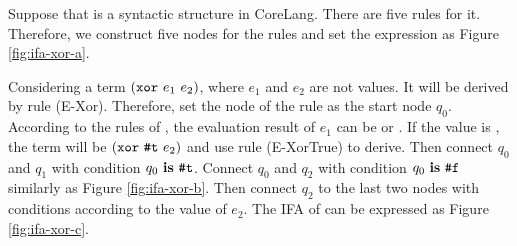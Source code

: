 
Suppose that  is a syntactic structure in CoreLang. There are five rules for it. Therefore, we construct five nodes for the rules and set the expression as Figure \ref{fig:ifa-xor-a}.

Considering a term $(\mbox{\tt xor}~e_1~e_2)$, where $e_1$ and $e_2$ are not values. It will be derived by rule (E-Xor). Therefore, set the node of the rule as the start node $q_0$. According to the rules of , the evaluation result of $e_1$ can be  or . If the value is , the term will be $(\mbox{\tt xor}~\mbox{\tt \#t}~e_2)$ and use rule (E-XorTrue) to derive. Then connect $q_0$ and $q_1$ with condition $q_0~\mbox{\rm \bf is}~\mbox{\tt \#t}$. Connect $q_0$ and $q_2$ with condition $q_0~\mbox{\rm \bf is}~\mbox{\tt \#f}$ similarly as Figure \ref{fig:ifa-xor-b}. Then connect $q_2$ to the last two nodes with conditions according to the value of $e_2$. The IFA of  can be expressed as Figure \ref{fig:ifa-xor-c}.

